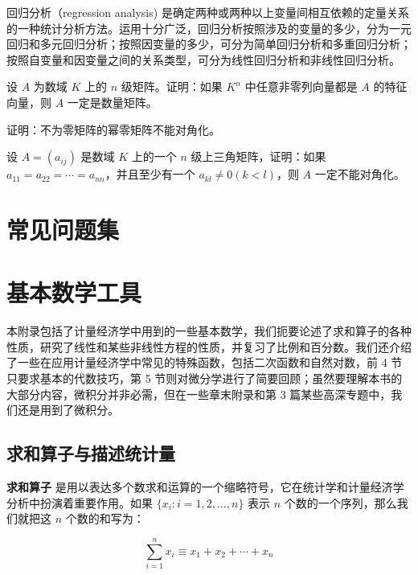 \documentclass[lang=cn,10pt]{elegantbook}
\begin{document}
\begin{conclusion}
回归分析（regression analysis) 是确定两种或两种以上变量间相互依赖的定量关系的一种统计分析方法。运用十分广泛，回归分析按照涉及的变量的多少，分为一元回归和多元回归分析；按照因变量的多少，可分为简单回归分析和多重回归分析；按照自变量和因变量之间的关系类型，可分为线性回归分析和非线性回归分析。
\end{conclusion}

\begin{problemset}
\item 设 $A$ 为数域 $K$ 上的 $n$ 级矩阵。证明：如果 $K^n$ 中任意非零列向量都是 $A$ 的特征向量，则 $A$ 一定是数量矩阵。
\item 证明：不为零矩阵的幂零矩阵不能对角化。
\item 设 $A = (a_{ij})$ 是数域 $K$ 上的一个 $n$ 级上三角矩阵，证明：如果 $a_{11} = a_{22} = \cdots = a_{nn}$，并且至少有一个 $a_{kl} \not = 0 (k < l)$，则 $A$ 一定不能对角化。
\end{problemset}

\chapter{常见问题集}


\nocite{*}
\printbibliography[heading=bibintoc, title=\ebibname]
\appendix

\chapter{基本数学工具}


本附录包括了计量经济学中用到的一些基本数学，我们扼要论述了求和算子的各种性质，研究了线性和某些非线性方程的性质，并复习了比例和百分数。我们还介绍了一些在应用计量经济学中常见的特殊函数，包括二次函数和自然对数，前 4 节只要求基本的代数技巧，第 5 节则对微分学进行了简要回顾；虽然要理解本书的大部分内容，微积分并非必需，但在一些章末附录和第 3 篇某些高深专题中，我们还是用到了微积分。

\section{求和算子与描述统计量}

\textbf{求和算子} 是用以表达多个数求和运算的一个缩略符号，它在统计学和计量经济学分析中扮演着重要作用。如果 $\{x_i: i=1, 2, \ldots, n\}$ 表示 $n$ 个数的一个序列，那么我们就把这 $n$ 个数的和写为：

\begin{equation}
\sum_{i=1}^n x_i \equiv x_1 + x_2 +\cdots + x_n
\end{equation}
\end{document}
